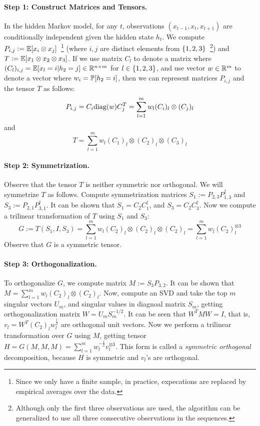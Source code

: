 \paragraph{Step 1: Construct Matrices and Tensors.} In the hidden Markov model, for any $t$, observations $(x_{t-1}, x_t, x_{t+1})$ are conditionally independent given the hidden state $h_t$. We compute
$P_{i,j} := \E[x_i \otimes x_j]$~\footnote{Since we only have a finite sample, in practice, expecations are replaced by empirical averages over the data.} (where $i,j$ are distinct elements from $\cbr{1,2,3}$~\footnote{Although only the first three observations are used, the algorithm can be generalized to use all three consecutive observations in the sequences.}) and $T := \E[x_1 \otimes x_2 \otimes x_3]$. If we use matrix $C_l$ to denote a matrix where $(C_l)_{i,j} = \E[x_l = i | h_2 = j] \in \R^{n \times m}$ for $l \in \cbr{1,2,3}$, and use vector $w \in \R^m$ to denote a vector where $w_i = \P[h_2 = i]$,
then we can represent matrices $P_{i,j}$ and the tensor $T$ as follows:
\begin{equation}
  P_{i,j} = C_i \diag(w) C_j^T = \sum_{l=1}^m w_l (C_i)_l \otimes (C_j)_l
  \label{eqn:pij}
\end{equation}
and
\begin{equation}
  T = \sum_{l=1}^m w_l (C_1)_l \otimes (C_2)_l \otimes (C_3)_l
  \label{eqn:t}
\end{equation}

\paragraph{Step 2: Symmetrization.} Observe that the tensor $T$ is neither symmetric nor
orthogonal. We will symmetrize $T$ as follows.
Compute symmetrization matrices $S_1 := P_{2,3} P_{1,3}^\dagger$ and $S_3 := P_{2,1} P_{3,1}^\dagger$. It can be shown that $S_1 = C_2 C_1^\dagger$, and
$S_3 = C_2 C_3^\dagger$. Now we compute a trilinear transformation of $T$ using $S_1$ and $S_3$:
\[ G := T(S_1, I, S_3) = \sum_{l=1}^m w_l (C_2)_l \otimes (C_2)_l \otimes (C_2)_l = \sum_{l=1}^m w_l (C_2)_l^{\otimes 3} \]
Observe that $G$ is a symmetric tensor.

\paragraph{Step 3: Orthogonalization.} To orthogonalize $G$, we compute matrix $M := S_3 P_{3,2}$. It can be shown that $M = \sum_{l=1}^m w_l (C_2)_l \otimes (C_2)_l$.
Now, compute an SVD and take the top $m$ singular vectors $U_m$, and singular values in diagnoal matrix $S_m$, getting orthogonalization matrix $W = U_m S_m^{-1/2}$. It can be seen that $W^T M W = I$, that is, $v_l = W^T (C_2)_l w_l^{\frac 1 2}$ are orthogonal unit vectors.
Now we perform a trilinear transformation over $G$ using $M$, getting tensor $H = G(M, M, M) = \sum_{l=1}^m w_l^{-\frac 1 2} v_l^{\otimes 3}$.
This form is called a {\em symmetric orthogonal} decomposition, because $H$ is symmetric and $v_l$'s are orthogonal.

